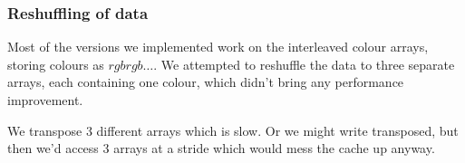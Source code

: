 \subsubsection{Reshuffling of data}

Most of the versions we implemented work on the interleaved colour arrays, storing colours as $rgbrgb\dots$. We attempted to reshuffle the data to three separate arrays, each containing one colour, which didn't bring any performance improvement. 

We transpose 3 different arrays which is slow. Or we might write transposed, but then we'd access 3 arrays at a stride which would mess the cache up anyway.

%
%
%
%
